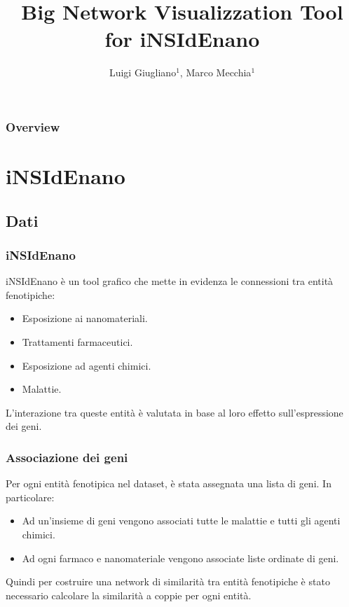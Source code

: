 \documentclass{beamer}
\title{Big Network Visualizzation Tool for iNSIdEnano}
\author{Luigi Giugliano$^1$, Marco Mecchia$^1$}
\institute{$^1$Universit\'a degli studi di Salerno}
\begin{document}
\begin{frame}
   \maketitle
\end{frame}

\begin{frame}
  \frametitle{Overview}
  \footnotesize \tableofcontents
\end{frame}



\section{iNSIdEnano}
\subsection{Dati}
\begin{frame}
\frametitle{iNSIdEnano}
iNSIdEnano è un tool grafico che mette in evidenza le connessioni tra \alert{entità fenotipiche}:
\begin{itemize}
\item Esposizione ai nanomateriali.
\item Trattamenti farmaceutici.
\item Esposizione ad agenti chimici.
\item Malattie.
\end{itemize}
L'interazione tra queste entità è valutata in base al loro effetto sull'espressione dei geni.
\end{frame}

\begin{frame}
\frametitle{Associazione dei geni}
Per ogni entità fenotipica nel dataset, è stata assegnata una lista di geni. In particolare:
\begin{itemize}
	\item Ad un'insieme di geni vengono associati tutte le malattie e tutti gli agenti chimici.
	\item Ad ogni farmaco e nanomateriale vengono associate liste ordinate di geni.
\end{itemize}
\medskip
Quindi per costruire una network di similarità tra entità fenotipiche è stato necessario calcolare la similarità a coppie per ogni entità.
\end{frame}
\end{document}
